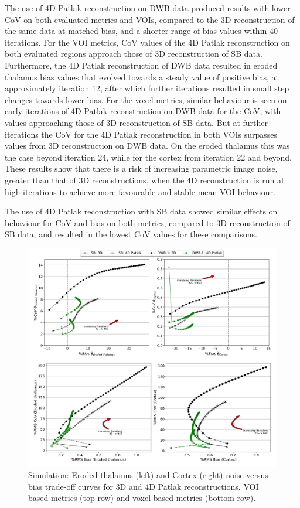The use of 4D Patlak reconstruction on DWB data produced results with lower CoV on both evaluated metrics and VOIs, compared to the 3D reconstruction of the same data at matched bias, and a shorter range of bias values within 40 iterations.
For the VOI metrics, CoV values of the 4D Patlak reconstruction on both evaluated regions approach those of 3D reconstruction of SB data. Furthermore, the 4D Patlak reconstruction of DWB data resulted in eroded thalamus bias values that evolved towards a steady value of positive bias, at approximately iteration 12, after which further iterations resulted in small step changes towards lower bias. 
For the voxel metrics, similar behaviour is seen on early iterations of 4D Patlak reconstruction on DWB data for the CoV, with values approaching those of 3D reconstruction of SB data. But at further iterations the CoV for the 4D Patlak reconstruction in both VOIs surpasses values from 3D reconstruction on DWB data. On the eroded thalamus this was the case beyond iteration 24, while for the cortex from iteration 22 and beyond. These results show that there is a risk of increasing parametric image noise, greater than that of 3D reconstructions, when the 4D reconstruction is run at high iterations to achieve more favourable and stable mean VOI behaviour.

The use of 4D Patlak reconstruction with SB data showed similar effects on behaviour for CoV and bias on both metrics, compared to 3D reconstruction of SB data, and resulted in the lowest CoV values for these comparisons.

\begin{figure} [ht!]
\centering
\includegraphics[scale=0.42,angle=0]{3_Results/3_2_Dynamic_Reconstruction_SimulationStudy/figures/VOI/3_1.pdf}
\caption{Simulation: Eroded thalamus (left) and Cortex (right) noise versus bias trade-off curves for 3D and 4D Patlak reconstructions. 
VOI based metrics (top row) and voxel-based metrics (bottom row).
}
\label{fig:3_1_Patlak}
\end{figure} 

